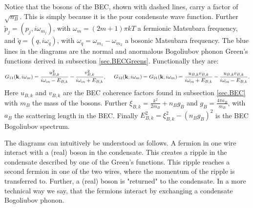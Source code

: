 Notice that the bosons of the BEC, shown with dashed lines, carry a factor of $\sqrt{n_B}$. This is simply because it is the pour condensate wave function. Further $\tilde{p}_j = (p_j, i\omega_{m_j})$, with $\omega_{m} = (2m + 1)\pi kT$ a fermionic Matsubara frequency, and $\tilde{q} = (q, i\omega_q )$, with $\omega_q = \omega_{m_1} - \omega_{m_2}$ a bosonic Matsubara frequency. The blue lines in the diagrams are the normal and anormalous Bogoliubov phonon Green's functions derived in subsection \ref{sec.BECGreens}. Functionally they are:
\begin{equation}
G_{11}(\mathbf{k},i\omega_m) = \frac{u_{B,k}^2}{i\omega_m-E_{B,k}}-\frac{v_{B,k}^2}{i\omega_m+E_{B,k}}, \hspace{0.5cm} G_{12}(\mathbf{k},i\omega_m) = G_{21}(\mathbf{k},i\omega_m) = \frac{u_{B,k}v_{B,k}}{i\omega_m+E_{B,k}}-\frac{u_{B,k}v_{B,k}}{i\omega_m-E_{B,k}}.\nonumber
\end{equation}
Here $u_{B,k}$ and $v_{B,k}$ are the BEC coherence factors found in subsection \ref{sec.BEC} with $m_B$ the mass of the bosons. Further $\xi_{B,k} = \frac{k^2}{2m_B} + n_Bg_B$ and $g_B = \frac{4\pi a_B}{m_B}$, with $a_B$ the scattering length in the BEC. Finally $E_{B,k}^2 = \xi_{B,k}^2-(n_Bg_B)^2$ is the BEC Bogoliubov spectrum.

The diagrams can intuitively be understood as follows. A fermion in one wire interact with a (real) boson in the condensate. This creates a ripple in the condensate described by one of the Green's functions. This ripple reaches a second fermion in one of the two wires, where the momentum of the ripple is transferred to. Further, a (real) boson is "returned" to the condensate. In a more technical way we say, that the fermions interact by exchanging a condensate Bogoliubov phonon. 

